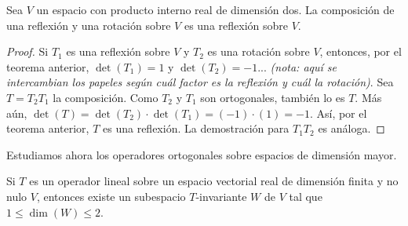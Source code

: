 \begin{corolario}
    Sea $V$ un espacio con producto interno real de dimensión dos. La composición de una reflexión y una rotación sobre $V$ es una reflexión sobre $V$.
\end{corolario}

\begin{proof}
    Si $T_1$ es una reflexión sobre $V$ y $T_2$ es una rotación sobre $V$, entonces, por el teorema anterior, $\det(T_1)=1$ y $\det(T_2)=-1$... \emph{(nota: aquí se intercambian los papeles según cuál factor es la reflexión y cuál la rotación)}. Sea $T=T_2T_1$ la composición. Como $T_2$ y $T_1$ son ortogonales, también lo es $T$. Más aún, $\det(T)=\det(T_2)\cdot\det(T_1)=(-1)\cdot(1)=-1$. Así, por el teorema anterior, $T$ es una reflexión. La demostración para $T_1T_2$ es análoga.
\end{proof}

Estudiamos ahora los operadores ortogonales sobre espacios de dimensión mayor.

\begin{lema}
    Si $T$ es un operador lineal sobre un espacio vectorial real de dimensión finita y no nulo $V$, entonces existe un subespacio $T$-invariante $W$ de $V$ tal que $1\leq\dim(W)\leq 2$.
\end{lema}

